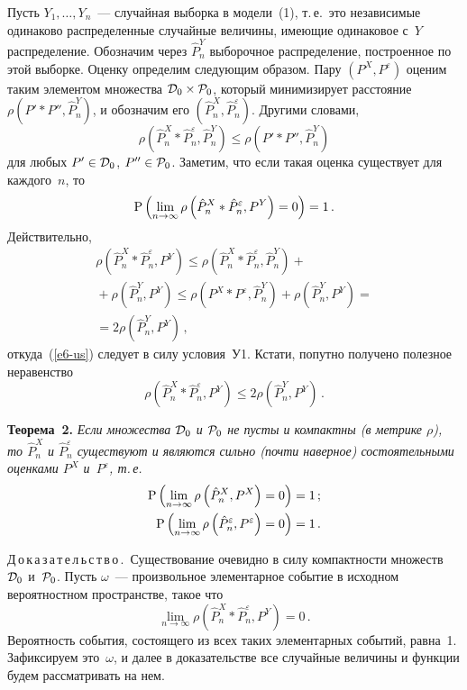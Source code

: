 \begin{multicols}{2}
Пусть $Y_1,\ldots ,Y_n$~--- случайная выборка в модели~(1), т.\,е.\ это
независимые одинаково распределенные случайные величины, имеющие
одинаковое с~$Y$ распределение. Обозначим через $\hat P^Y_n$
выборочное распределение, построенное по этой выборке. Оценку
определим следующим образом. Пару $(P^X,P^\varepsilon)$ оценим таким
элементом множества ${\cal D}_0\times{\cal P}_0$, который
минимизирует расстояние $\rho(P'\ast P'',\hat P_n^Y)$, и обозначим
его $(\hat P^X_n,\hat P^\varepsilon_n)$. Другими словами,
\begin{equation*}
\rho\left(\hat P_n^X\ast\hat P_n^\varepsilon,\hat P_n^Y\right)
\le\rho\left(P'\ast P'',\hat P_n^Y\right) %
\end{equation*}
для любых $P'\in{\cal D}_0$, $P''\in{\cal P}_0$. Заметим, что
если такая оценка существует для каждого~$n$, то
\begin{equation}
{\rm P}\left(\lim_{n\to\infty}
\rho\left(\hat P_n^X\ast\hat P_n^\varepsilon,P^Y\right)=0\right)=1\,.
\label{e6-us}
\end{equation}
Действительно,
\begin{multline*}
\rho\left(\hat P_n^X\ast\hat P_n^\varepsilon,P^Y\right)\le
\rho\left(\hat P_n^X\ast\hat P_n^\varepsilon,\hat P_n^Y\right)+{}\\
{}+
\rho\left(\hat P_n^Y,P^Y\right)\le
\rho\left(P^X\ast P^\varepsilon,\hat P_n^Y\right)+
\rho\left(\hat P_n^Y,P^Y\right)={}\\
{}=2\rho\left(\hat P_n^Y,P^Y\right)\,,
\end{multline*}
откуда~(\ref{e6-us}) следует в силу условия~У1. Кстати, попутно получено
полезное неравенство
$$
\rho\left(\hat P_n^X\ast\hat P_n^\varepsilon,P^Y\right)\le
2\rho\left(\hat P_n^Y,P^Y\right)\,.
$$

\smallskip

\noindent
\textbf{Теорема~2.} \textit{Если множества ${\cal D}_0$ и ${\cal P}_0$ не
пусты и компактны (в метрике $\rho$), то $\hat P_n^X$ и $\hat
P_n^\varepsilon$ существуют и являются сильно (почти наверное)
состоятельными оценками $P^X$ и~$P^\varepsilon$, т.\,е.\
\begin{align*}
{\rm P}\left(\lim_{n\to\infty}\rho\left(\hat P_n^X,P^X\right)=0\right)&=1\,;\\
{\rm P}\left(\lim_{n\to\infty}\rho\left(\hat P_n^\varepsilon,P^\varepsilon\right)=0\right)&=1\,.
\end{align*}
}


\smallskip

\noindent
Д\,о\,к\,а\,з\,а\,т\,е\,л\,ь\,с\,т\,в\,о\,.\ Существование очевидно в силу компактности
множеств ${\cal D}_0$ и~${\cal P}_0$.
Пусть $\omega$~--- произвольное элементарное
событие в исходном вероятностном пространстве, такое что
\begin{equation}
\lim_{n\to\infty}\rho\left(\hat P_n^X\ast\hat P_n^\varepsilon,P^Y\right)=0\,.
\label{e7-us}
\end{equation}
Вероятность события, состоящего из всех таких элементарных
событий, равна~1. Зафиксируем это~$\omega$, и далее в доказательстве
все случайные величины и функции будем рассматривать на нем.


\end{multicols}
